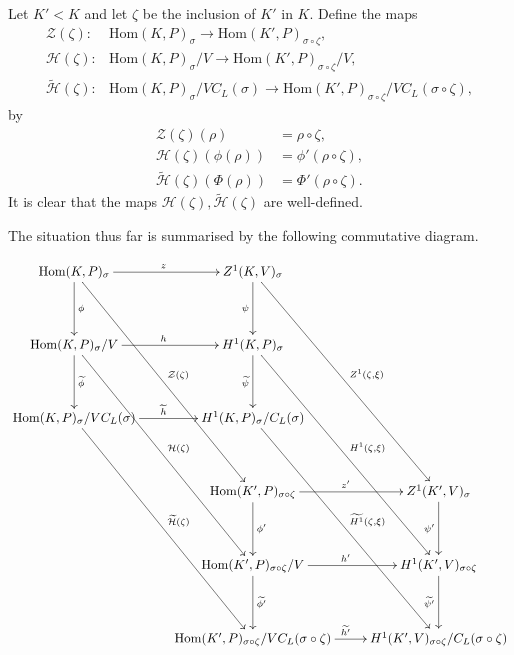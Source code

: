 \begin{definition} \label{main_cd} Let $K' < K$ and let $\zeta$ be the inclusion of $K'$ in $K$. Define the maps
	\begin{align*}
		\mathcal{Z}(\zeta):&\mathrm{Hom}(K, P)_\sigma \rightarrow \mathrm{Hom}(K', P)_{\sigma\circ\zeta}, \\
		\mathcal{H}(\zeta):&\mathrm{Hom}(K, P)_\sigma/V \rightarrow \mathrm{Hom}(K', P)_{\sigma\circ\zeta}/V, \\
		\widetilde{\mathcal{H}}(\zeta):&\mathrm{Hom}(K, P)_\sigma/VC_L(\sigma) \rightarrow \mathrm{Hom}(K', P)_{\sigma\circ\zeta}/VC_L(\sigma\circ\zeta),
	\end{align*}
	by
	\begin{align*}
		\mathcal{Z}(\zeta)(\rho) &= \rho\circ\zeta, \\
		\mathcal{H}(\zeta)(\phi(\rho)) &= \phi'(\rho\circ\zeta), \\
		\widetilde{\mathcal{H}}(\zeta)(\Phi(\rho)) &= \Phi'(\rho\circ\zeta).
	\end{align*}
It is clear that the maps $\mathcal{H}(\zeta), \widetilde{\mathcal{H}}(\zeta)$ are well-defined.

The situation thus far is summarised by the following commutative diagram.
\par\nobreak
	{\small
	\setlength{\abovedisplayskip}{6pt}
	\setlength{\belowdisplayskip}{\abovedisplayskip}
	\setlength{\abovedisplayshortskip}{3pt}
	\setlength{\belowdisplayshortskip}{3pt}
	\begin{align*}
		\xymatrix@R=40pt{
			\mathrm{Hom}(K, P)_\sigma \ar[r]^{z} \ar[d]^{\phi} \ar[dddr]^{\mathcal{Z}(\zeta)} & Z^1(K, V)_\sigma \ar[d]_{\psi} \ar[dddr]^{Z^1(\zeta, \xi)} & \\
			\mathrm{Hom}(K, P)_\sigma/V \ar[r]^{h} \ar[d]^{\widetilde{\phi}} \ar[dddr]^{\mathcal{H}(\zeta)} & H^1(K, P)_\sigma \ar[d]_{\widetilde{\psi}} \ar[dddr]^{H^1(\zeta, \xi)} & \\
			\mathrm{Hom}(K, P)_\sigma/VC_L(\sigma) \ar[r]^{\widetilde{h}} \ar[dddr]^{\widetilde{\mathcal{H}}(\zeta)} & H^1(K, P)_\sigma/C_L(\sigma) \ar[dddr]^{\widetilde{H^1}(\zeta, \xi)} & \\
			& \mathrm{Hom}(K', P)_{\sigma\circ\zeta} \ar[r]^{z'} \ar[d]^{\phi'} & Z^1(K', V)_\sigma \ar[d]_{\psi'} \\
			& \mathrm{Hom}(K', P)_{\sigma\circ\zeta}/V \ar[r]^{h'} \ar[d]^{\widetilde{\phi'}} & H^1(K', V)_{\sigma\circ\zeta} \ar[d]_{\widetilde{\psi'}} \\
			& \mathrm{Hom}(K', P)_{\sigma\circ\zeta}/VC_L(\sigma\circ\zeta) \ar[r]^{\widetilde{h'}} & H^1(K', V)_{\sigma\circ\zeta}/C_L(\sigma\circ\zeta) \\
		}
	\end{align*}
	}%
\end{definition}

